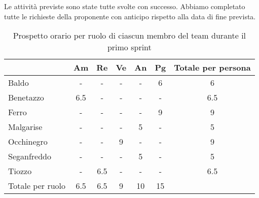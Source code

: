         Le attività previste sono state tutte svolte con successo. Abbiamo completato tutte le richieste della proponente con anticipo rispetto alla data di fine prevista.
        \begin{table}[!h]
            \centering
            \begin{tabular}{ |l| c | c | c | c | c | c | } 
                \hline
                \textbf{} & \textbf{Am} & \textbf{Re} & \textbf{Ve} &\textbf{An} & \textbf{Pg} & \textbf{Totale per persona} \\
                \hline 
                Baldo       & - & -   & - & - & 6     & 6       \\ 
                Benetazzo   &  6.5    & - & - & - & - & 6.5     \\ 
                Ferro       & - & -   & - & - & 9     & 9       \\ 
                Malgarise   & - & -   & - & 5 & -     & 5       \\ 
                Occhinegro  & - & -   & 9 & - & -     & 9       \\ 
                Seganfreddo & - & -   & - & 5 & -     & 5       \\
                Tiozzo      & - & 6.5 & - & - & -     & 6.5     \\ 
                \hline
                Totale per ruolo & 6.5 & 6.5 & 9 & 10 & 15 &    \\
                \hline
            \end{tabular}
            \caption{Prospetto orario per ruolo di ciascun membro del team durante il primo sprint}
            \label{tab:2}
        \end{table}
        \newpage
